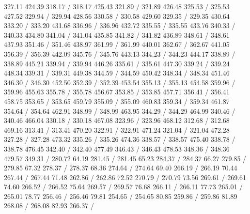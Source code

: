 { 327.11 424.39 318.17 /
 318.17 425.43 321.89 /
 321.89 426.48 325.53 /
 325.53 427.52 329.94 /
 329.94 428.56 330.58 /
 330.58 429.60 329.35 /
 329.35 430.64 333.20 /
 333.20 431.68 336.96 /
 336.96 432.72 335.55 /
 335.55 433.76 340.33 /
 340.33 434.80 341.04 /
 341.04 435.85 341.82 /
 341.82 436.89 348.61 /
 348.61 437.93 351.46 /
 351.46 438.97 361.99 /
 361.99 440.01 362.67 /
 362.67 441.05 356.39 /
 356.39 442.09 345.76 /
 345.76 443.13 344.23 /
 344.23 444.17 338.89 /
 338.89 445.21 339.94 /
 339.94 446.26 335.61 /
 335.61 447.30 339.24 /
 339.24 448.34 339.31 /
 339.31 449.38 344.59 /
 344.59 450.42 348.34 /
 348.34 451.46 346.30 /
 346.30 452.50 352.39 /
 352.39 453.54 355.13 /
 355.13 454.58 359.96 /
 359.96 455.63 355.78 /
 355.78 456.67 353.85 /
 353.85 457.71 356.41 /
 356.41 458.75 353.65 /
 353.65 459.79 355.09 /
 355.09 460.83 359.34 /
 359.34 461.87 354.64 /
 354.64 462.91 348.99 /
 348.99 463.95 344.29 /
 344.29 464.99 340.46 /
 340.46 466.04 330.18 /
 330.18 467.08 323.96 /
 323.96 468.12 312.68 /
 312.68 469.16 313.41 /
 313.41 470.20 322.91 /
 322.91 471.24 321.04 /
 321.04 472.28 327.28 /
 327.28 473.32 335.26 /
 335.26 474.36 338.57 /
 338.57 475.40 338.78 /
 338.78 476.45 342.40 /
 342.40 477.49 346.43 /
 346.43 478.53 348.36 /
 348.36 479.57 349.31 /
\setsolid
{} 280.72 64.19 281.45 /
 281.45 65.23 284.37 /
 284.37 66.27 279.85 /
 279.85 67.32 278.37 /
 278.37 68.36 274.64 /
 274.64 69.40 266.19 /
 266.19 70.44 267.44 /
 267.44 71.48 262.86 /
 262.86 72.52 270.79 /
 270.79 73.56 269.61 /
 269.61 74.60 266.52 /
 266.52 75.64 269.57 /
 269.57 76.68 266.11 /
 266.11 77.73 265.01 /
 265.01 78.77 256.46 /
 256.46 79.81 254.65 /
 254.65 80.85 259.86 /
 259.86 81.89 268.08 /
 268.08 82.93 266.37 /
}
